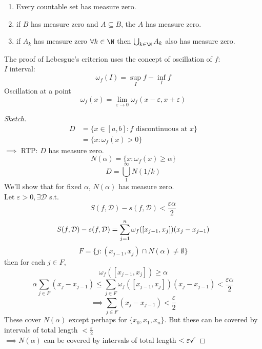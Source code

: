 \begin{lemma}
\hfill{ }
\begin{enumerate}
    \item Every countable set has measure zero.\\
    \item if $B$ has measure zero and $A\subseteq B$, the $A$ has measure zero.
    \item if $A_k$ has measure zero $\forall k\in \N$ then
    $\bigcup_{k\in \N}A_k$ also has measure zero.\\
\end{enumerate}
\begin{note}
The proof of Lebesgue's criterion uses the concept of oscillation of $f$:\\
$I$ interval:
\[\omega_f(I) = \sup_If - \inf_I f\]
Oscillation at a point
\[\omega_f(x) = \lim_{\varepsilon \to 0}\omega_f(x-\varepsilon, x + \varepsilon)\]

\end{note}
\begin{proof}[Sketch]
\begin{align*}
    D &= \{x\in [a,b]:f\text{ discontinuous at }x\}\\
    &=\{x:\omega_f(x) > 0\}
\end{align*}
$\implies$ RTP: $D$ has measure zero.
\[N(\alpha) = \{x:\omega_f(x)\geq \alpha\}\]
\[D = \bigcup_1^{\infty}N(1/k)\]
We'll show that for fixed $\alpha$, $N(\alpha)$ has measure zero.\\
Let $\varepsilon > 0, \exists \mathcal{D}$ s.t.
\[S(f,\mathcal{D}) - s(f,\mathcal{D}) < \frac{\varepsilon \alpha}{2}\]
\[S(f,\mathcal{D}) - s(f,\mathcal{D}) = \s[j] n \omega_f([x_{j-1},x_j])(x_j - x_{j-1})\]
\[F = \{j: (x_{j-1},x_j)\cap N(\alpha) \neq \emptyset\}\]
then for each $j\in F$,
\[\omega_f([x_{j-1},x_j])\geq \alpha\]
\[\alpha\sum_{j\in F}(x_j - x_{j-1})\leq \sum_{j\in F}\omega_f([x_{j-1},x_j])(x_j - x_{j-1})< \frac{\varepsilon \alpha}{2}\]
\[\implies \sum_{j\in F}(x_j - x_{j-1}) < \frac{\varepsilon}{2}\]
These cover $N(\alpha)$ except perhaps for $\{x_0,x_1,x_n\}$. But these can be covered by intervals of total length $<\frac{\varepsilon}{2}$\\
$\implies N(\alpha)$ can be covered by intervals of total length $<\varepsilon \tick$
\end{proof}
\end{lemma}
